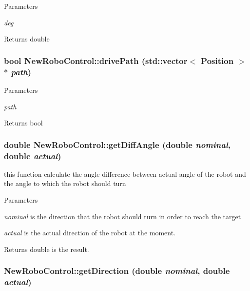 \begin{DoxyParams}{Parameters}
\item[{\em deg}]\end{DoxyParams}
\begin{DoxyReturn}{Returns}
double 
\end{DoxyReturn}
\hypertarget{classNewRoboControl_a9816eae1b7c90dbb74a7e0365e2b57e9}{
\subsubsection[{drivePath}]{\setlength{\rightskip}{0pt plus 5cm}bool NewRoboControl::drivePath (std::vector$<$ Position $>$ $\ast$ {\em path})}}
\label{classNewRoboControl_a9816eae1b7c90dbb74a7e0365e2b57e9}

\begin{DoxyParams}{Parameters}
\item[{\em path}]\end{DoxyParams}
\begin{DoxyReturn}{Returns}
bool 
\end{DoxyReturn}
\hypertarget{classNewRoboControl_a960c714f4f8828d16dc955c871affbb5}{
\subsubsection[{getDiffAngle}]{\setlength{\rightskip}{0pt plus 5cm}double NewRoboControl::getDiffAngle (double {\em nominal}, \/  double {\em actual})}}
\label{classNewRoboControl_a960c714f4f8828d16dc955c871affbb5}


this function calculate the angle difference between actual angle of the robot and the angle to which the robot should turn 


\begin{DoxyParams}{Parameters}
\item[{\em nominal}]is the direction that the robot should turn in order to reach the target \item[{\em actual}]is the actual direction of the robot at the moment. \end{DoxyParams}
\begin{DoxyReturn}{Returns}
double is the result. 
\end{DoxyReturn}
\hypertarget{classNewRoboControl_a9979ccfbc622d9082fb034caf36c514b}{
\subsubsection[{getDirection}]{ NewRoboControl::getDirection (double {\em nominal}, \/  double {\em actual})}}
\label{classNewRoboControl_a9979ccfbc622d9082fb034caf36c514b}


